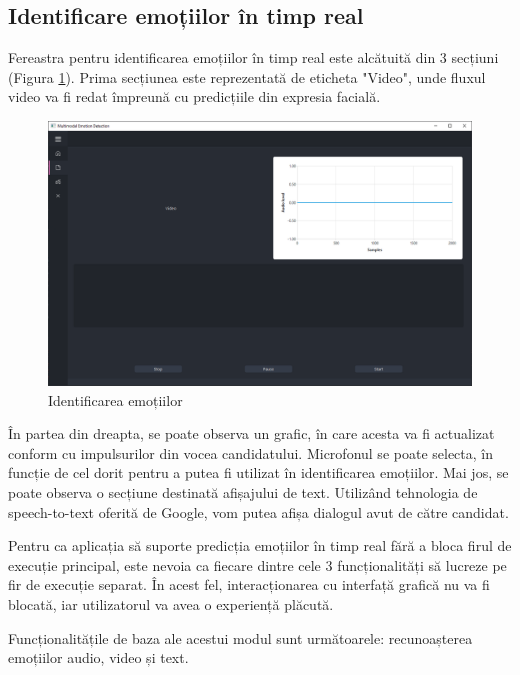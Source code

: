 \documentclass[a4paper, 12pt]{report}
\begin{document}
	\clearpage
	\subsection{Identificare emoțiilor în timp real}
	Fereastra pentru identificarea emoțiilor în timp real este alcătuită din 3 secțiuni (Figura \ref{fig:emotion_recog_clean}). Prima secțiunea este reprezentată de eticheta "Video", unde fluxul video va fi redat împreună cu predicțiile din expresia facială.
	
	\begin{figure}[H]
		\begin{center}
			\includegraphics[scale=0.4]{images/emotion_recognition_clean.png}
		\end{center}
		\caption{Identificarea emoțiilor}
		\label{fig:emotion_recog_clean}
	\end{figure} 
	
	În partea din dreapta, se poate observa un grafic, în care acesta va fi actualizat conform cu impulsurilor din vocea candidatului. Microfonul se poate selecta, în funcție de cel dorit pentru a putea fi utilizat în identificarea emoțiilor. Mai jos, se poate observa o secțiune destinată afișajului de text. Utilizând tehnologia de speech-to-text oferită de Google, vom putea afișa dialogul avut de către candidat.
	
	Pentru ca aplicația să suporte predicția emoțiilor în timp real fără a bloca firul de execuție principal, este nevoia ca fiecare dintre cele 3 funcționalități să lucreze pe fir de execuție separat. În acest fel, interacționarea cu interfață grafică nu va fi blocată, iar utilizatorul va avea o experiență plăcută.
	
	Funcționalitățile de baza ale acestui modul sunt următoarele: recunoașterea emoțiilor audio, video și text.	
	
\end{document}
